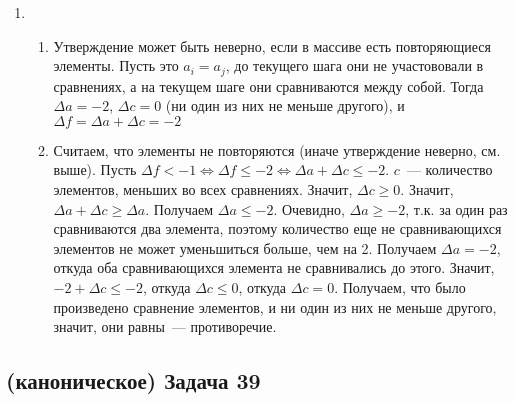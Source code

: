 \documentclass[a4paper]{article}
\newcommand{\NN}{\mathbb{N}}
\begin{document}
\begin{enumerate}
\begin{enumerate}
\end{enumerate}
\item \begin{enumerate}
\item Утверждение может быть неверно, если в массиве есть повторяющиеся элементы. Пусть это $a_i=a_j$, до текущего шага они не участововали в сравнениях, а на текущем шаге они сравниваются между собой. Тогда $\Delta a=-2$, $\Delta c=0$ (ни один из них не меньше другого), и $\Delta f=\Delta a+\Delta c=-2$
\item Считаем, что элементы не повторяются (иначе 
утверждение неверно, см. выше). Пусть $\Delta f< -1\Leftrightarrow \Delta f\leqslant -2\Leftrightarrow \Delta a+\Delta c\leqslant -2$. $c$~--- количество элементов, меньших во всех сравнениях. Значит, $\Delta c\geqslant 0$. Значит, $\Delta a + \Delta c\geqslant \Delta a$. Получаем $\Delta a\leqslant -2$. Очевидно, $\Delta a\geqslant -2$, т.к. за один раз сравниваются два элемента, поэтому количество еще не сравнивающихся элементов не может уменьшиться больше, чем на 2. Получаем $\Delta a=-2$, откуда оба сравнивающихся элемента не сравнивались до этого. Значит, $-2+\Delta c\leqslant -2$, откуда $\Delta c\leqslant 0$, откуда $\Delta c=0$. Получаем, что было произведено сравнение элементов, и ни один из них не меньше другого, значит, они равны~--- противоречие.
\end{enumerate}
\end{enumerate}
\subsection*{(каноническое) Задача 39}
\end{document}
